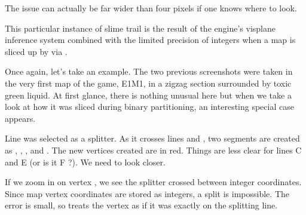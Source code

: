 The issue can actually be far wider than four pixels if one knows where to look.\\
\par
{}
\par
This particular instance of slime trail is the result of the engine's visplane inference system combined with the limited precision of integers when a map is sliced up by via .\\
\par
 Once again, let's take an example. The two previous screenshots were taken in the very first map of the game, E1M1, in a zigzag section surrounded by toxic green liquid. At first glance, there is nothing unusual here but when we take a look at how it was sliced during binary partitioning, an interesting special case appears.\\
\par
Line  was selected as a splitter. As it crosses lines  and , two segments are created as , , , and . The new vertices created are in red. Things are less clear for lines C and E (or is it F ?). We need to look closer. \\
\par
If we zoom in on vertex , we see the splitter crossed  between integer coordinates. Since map vertex coordinates are stored as integers, a split is impossible. The error is small, so  treats the vertex as if it was exactly on the splitting line.

\begin{minipage}{0.47\textwidth}
\end{minipage}
\hspace{4mm}
\begin{minipage}{0.47\textwidth}
\end{minipage} 
\par
\vspace{1mm}
\par



